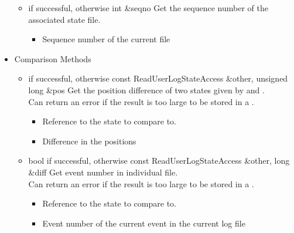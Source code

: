 \begin{itemize}
\begin{itemize}
\item {}
  {} { if successful,  otherwise}
  {int \&seqno}
  {Get the sequence number of the associated state file.}
  \begin{itemize}
  \item {}
    Sequence number of the current file
  \end{itemize}
\end{itemize}

\item Comparison Methods
\begin{itemize}

\item {}
  {} { if successful,  otherwise}
  {const ReadUserLogStateAccess \&other, unsigned long \&pos}
  {Get the position difference of two states given by  
  and .
    \\ \Note Can return an error if the result is too large to be
    stored in a .}
  \begin{itemize}
  \item {}
    Reference to the state to compare to.
  \item {}
    Difference in the positions
  \end{itemize}

\item {}
  {bool} { if successful,  otherwise}
  {const ReadUserLogStateAccess \&other, long \&diff}
  {Get event number in individual file.
    \\ \Note Can return an error if the result is too large to be
    stored in a .}
  \begin{itemize}
  \item {}
    Reference to the state to compare to.
  \item {} Event number of the current event in
    the current log file
  \end{itemize}


\end{itemize}
\end{itemize}

